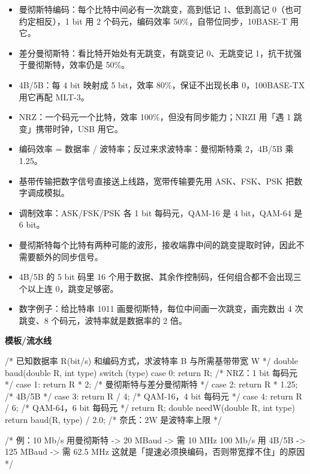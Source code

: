 \documentclass[10pt,a4paper]{ctexart}
\begin{document}
\begin{itemize}

\item 曼彻斯特编码：每个比特中间必有一次跳变，高到低记 1、低到高记 0（也可约定相反），1 bit 用 2 个码元，编码效率 50\%，自带位同步，10BASE-T 用它。

\item 差分曼彻斯特：看比特开始处有无跳变，有跳变记 0、无跳变记 1，抗干扰强于曼彻斯特，效率仍是 50\%。

\item 4B/5B：每 4 bit 映射成 5 bit，效率 80\%，保证不出现长串 0，100BASE-TX 用它再配 MLT-3。

\item NRZ：一个码元一个比特，效率 100\%，但没有同步能力；NRZI 用「遇 1 跳变」携带时钟，USB 用它。

\item 编码效率 = 数据率 / 波特率；反过来求波特率：曼彻斯特乘 2，4B/5B 乘 1.25。

\item 基带传输把数字信号直接送上线路，宽带传输要先用 ASK、FSK、PSK 把数字调成模拟。

\item 调制效率：ASK/FSK/PSK 各 1 bit 每码元，QAM-16 是 4 bit，QAM-64 是 6 bit。

\item 曼彻斯特每个比特有两种可能的波形，接收端靠中间的跳变提取时钟，因此不需要额外的同步信号。

\item 4B/5B 的 5 bit 码里 16 个用于数据、其余作控制码，任何组合都不会出现三个以上连 0，跳变足够密。

\item 数字例子：给比特串 1011 画曼彻斯特，每位中间画一次跳变，画完数出 4 次跳变、8 个码元，波特率就是数据率的 2 倍。

\end{itemize}


\textbf{模板/流水线}

\begin{codebox}
/* 已知数据率 R(bit/s) 和编码方式，求波特率 B 与所需基带带宽 W */
double baud(double R, int type) {
    switch (type) {
        case 0: return R;          /* NRZ：1 bit 每码元 */
        case 1: return R * 2;      /* 曼彻斯特与差分曼彻斯特 */
        case 2: return R * 1.25;   /* 4B/5B */
        case 3: return R / 4;      /* QAM-16，4 bit 每码元 */
        case 4: return R / 6;      /* QAM-64，6 bit 每码元 */
    }
    return R;
}
double needW(double R, int type) {
    return baud(R, type) / 2.0;    /* 奈氏：2W 是波特率上限 */
}

/* 例：10 Mb/s 用曼彻斯特 -> 20 MBaud -> 需 10 MHz
      100 Mb/s 用 4B/5B -> 125 MBaud -> 需 62.5 MHz
   这就是「提速必须换编码，否则带宽撑不住」的原因 */
\end{codebox}
\end{document}
